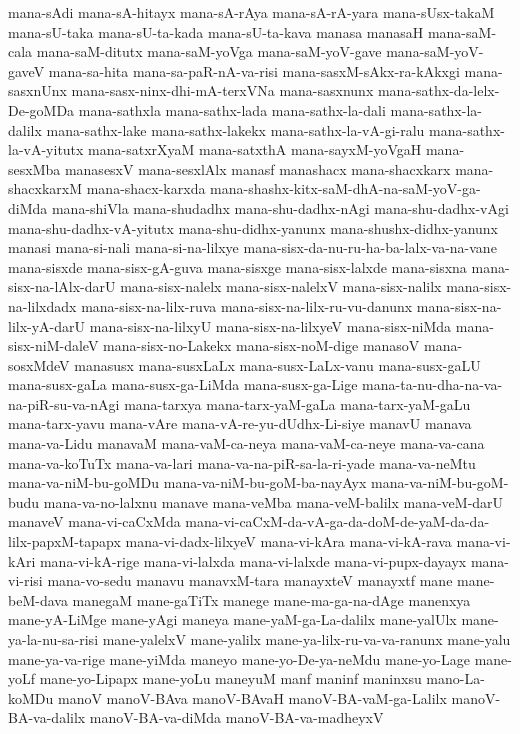 {mana-sAdi
mana-sA-hitayx
mana-sA-rAya
mana-sA-rA-yara
mana-sUsx-takaM
mana-sU-taka
mana-sU-ta-kada
mana-sU-ta-kava
manasa
manasaH
mana-saM-cala
mana-saM-ditutx
mana-saM-yoVga
mana-saM-yoV-gave
mana-saM-yoV-gaveV
mana-sa-hita
mana-sa-paR-nA-va-risi
mana-sasxM-sAkx-ra-kAkxgi
mana-sasxnUnx
mana-sasx-ninx-dhi-mA-terxVNa
mana-sasxnunx
mana-sathx-da-lelx-De-goMDa
mana-sathxla
mana-sathx-lada
mana-sathx-la-dali
mana-sathx-la-dalilx
mana-sathx-lake
mana-sathx-lakekx
mana-sathx-la-vA-gi-ralu
mana-sathx-la-vA-yitutx
mana-satxrXyaM
mana-satxthA
mana-sayxM-yoVgaH
mana-sesxMba
manasesxV
mana-sesxlAlx
manasf
manashacx
mana-shacxkarx
mana-shacxkarxM
mana-shacx-karxda
mana-shashx-kitx-saM-dhA-na-saM-yoV-ga-diMda
mana-shiVla
mana-shudadhx
mana-shu-dadhx-nAgi
mana-shu-dadhx-vAgi
mana-shu-dadhx-vA-yitutx
mana-shu-didhx-yanunx
mana-shushx-didhx-yanunx
manasi
mana-si-nali
mana-si-na-lilxye
mana-sisx-da-nu-ru-ha-ba-lalx-va-na-vane
mana-sisxde
mana-sisx-gA-guva
mana-sisxge
mana-sisx-lalxde
mana-sisxna
mana-sisx-na-lAlx-darU
mana-sisx-nalelx
mana-sisx-nalelxV
mana-sisx-nalilx
mana-sisx-na-lilxdadx
mana-sisx-na-lilx-ruva
mana-sisx-na-lilx-ru-vu-danunx
mana-sisx-na-lilx-yA-darU
mana-sisx-na-lilxyU
mana-sisx-na-lilxyeV
mana-sisx-niMda
mana-sisx-niM-daleV
mana-sisx-no-Lakekx
mana-sisx-noM-dige
manasoV
mana-sosxMdeV
manasusx
mana-susxLaLx
mana-susx-LaLx-vanu
mana-susx-gaLU
mana-susx-gaLa
mana-susx-ga-LiMda
mana-susx-ga-Lige
mana-ta-nu-dha-na-va-na-piR-su-va-nAgi
mana-tarxya
mana-tarx-yaM-gaLa
mana-tarx-yaM-gaLu
mana-tarx-yavu
mana-vAre
mana-vA-re-yu-dUdhx-Li-siye
manavU
manava
mana-va-Lidu
manavaM
mana-vaM-ca-neya
mana-vaM-ca-neye
mana-va-cana
mana-va-koTuTx
mana-va-lari
mana-va-na-piR-sa-la-ri-yade
mana-va-neMtu
mana-va-niM-bu-goMDu
mana-va-niM-bu-goM-ba-nayAyx
mana-va-niM-bu-goM-budu
mana-va-no-lalxnu
manave
mana-veMba
mana-veM-balilx
mana-veM-darU
manaveV
mana-vi-caCxMda
mana-vi-caCxM-da-vA-ga-da-doM-de-yaM-da-da-lilx-papxM-tapapx
mana-vi-dadx-lilxyeV
mana-vi-kAra
mana-vi-kA-rava
mana-vi-kAri
mana-vi-kA-rige
mana-vi-lalxda
mana-vi-lalxde
mana-vi-pupx-dayayx
mana-vi-risi
mana-vo-sedu
manavu
manavxM-tara
manayxteV
manayxtf
mane
mane-beM-dava
manegaM
mane-gaTiTx
manege
mane-ma-ga-na-dAge
manenxya
mane-yA-LiMge
mane-yAgi
maneya
mane-yaM-ga-La-dalilx
mane-yalUlx
mane-ya-la-nu-sa-risi
mane-yalelxV
mane-yalilx
mane-ya-lilx-ru-va-va-ranunx
mane-yalu
mane-ya-va-rige
mane-yiMda
maneyo
mane-yo-De-ya-neMdu
mane-yo-Lage
mane-yoLf
mane-yo-Lipapx
mane-yoLu
maneyuM
manf
maninf
maninxsu
mano-La-koMDu
manoV
manoV-BAva
manoV-BAvaH
manoV-BA-vaM-ga-Lalilx
manoV-BA-va-dalilx
manoV-BA-va-diMda
manoV-BA-va-madheyxV
}
